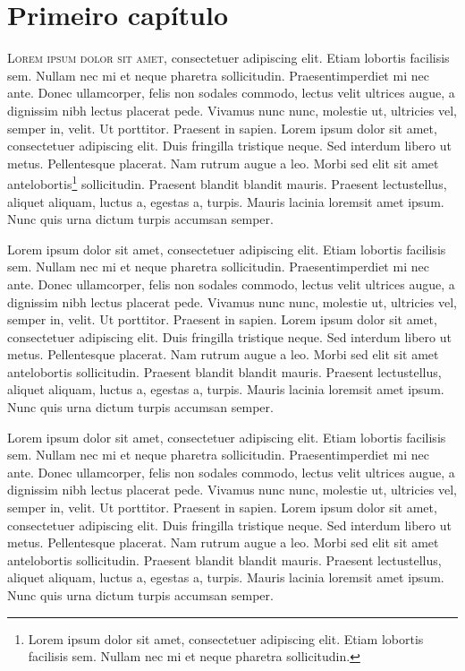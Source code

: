 \chapter{Primeiro capítulo}

\lettrine{L}{orem ipsum dolor sit amet}, consectetuer adipiscing elit. Etiam lobortis facilisis sem. Nullam nec mi et neque pharetra sollicitudin. Praesentimperdiet mi nec ante. Donec ullamcorper, felis non sodales commodo, lectus velit ultrices augue, a dignissim nibh lectus placerat pede. Vivamus nunc nunc, molestie ut, ultricies vel, semper in, velit. Ut porttitor. Praesent in sapien. Lorem ipsum dolor sit amet, consectetuer adipiscing elit. Duis fringilla tristique neque. Sed interdum libero ut metus. Pellentesque placerat. Nam rutrum augue a leo. Morbi sed elit sit amet antelobortis\footnote{Lorem ipsum dolor sit amet, consectetuer adipiscing elit. Etiam lobortis facilisis sem. Nullam nec mi et neque pharetra sollicitudin.} sollicitudin. Praesent blandit blandit mauris. Praesent lectustellus, aliquet aliquam, luctus a, egestas a, turpis. Mauris lacinia loremsit amet ipsum. Nunc quis urna dictum turpis accumsan semper.

Lorem ipsum dolor sit amet, consectetuer adipiscing elit. Etiam lobortis facilisis sem. Nullam nec mi et neque pharetra sollicitudin. Praesentimperdiet mi nec ante. Donec ullamcorper, felis non sodales commodo, lectus velit ultrices augue, a dignissim nibh lectus placerat pede. Vivamus nunc nunc, molestie ut, ultricies vel, semper in, velit. Ut porttitor. Praesent in sapien. Lorem ipsum dolor sit amet, consectetuer adipiscing elit. Duis fringilla tristique neque. Sed interdum libero ut metus. Pellentesque placerat. Nam rutrum augue a leo. Morbi sed elit sit amet antelobortis sollicitudin. Praesent blandit blandit mauris. Praesent lectustellus, aliquet aliquam, luctus a, egestas a, turpis. Mauris lacinia loremsit amet ipsum. Nunc quis urna dictum turpis accumsan semper.

Lorem ipsum dolor sit amet, consectetuer adipiscing elit. Etiam lobortis facilisis sem. Nullam nec mi et neque pharetra sollicitudin. Praesentimperdiet mi nec ante. Donec ullamcorper, felis non sodales commodo, lectus velit ultrices augue, a dignissim nibh lectus placerat pede. Vivamus nunc nunc, molestie ut, ultricies vel, semper in, velit. Ut porttitor. Praesent in sapien. Lorem ipsum dolor sit amet, consectetuer adipiscing elit. Duis fringilla tristique neque. Sed interdum libero ut metus. Pellentesque placerat. Nam rutrum augue a leo. Morbi sed elit sit amet antelobortis sollicitudin. Praesent blandit blandit mauris. Praesent lectustellus, aliquet aliquam, luctus a, egestas a, turpis. Mauris lacinia loremsit amet ipsum. Nunc quis urna dictum turpis accumsan semper.

